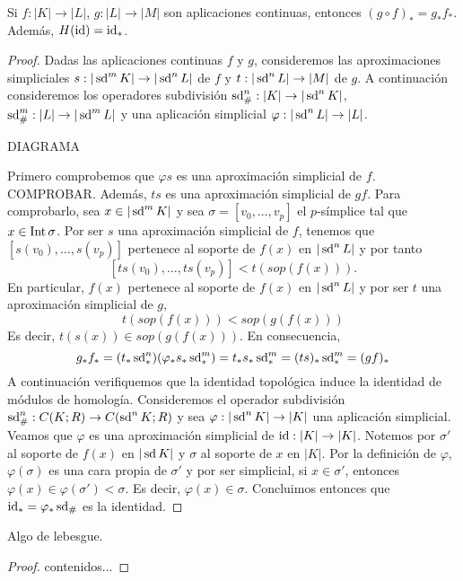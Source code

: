 \begin{teorema}
	Si $f: |K| \to |L|$, $g: |L| \to |M|$ son aplicaciones continuas, entonces $(g \circ f)_* = g_*f_*$. Además, $H(\operatorname{id}) = \operatorname{id}_*$.
\end{teorema}
\begin{proof}
	Dadas las aplicaciones continuas $f$ y $g$, consideremos las aproximaciones simpliciales $s : |\operatorname{sd}^m K| \to |\operatorname{sd}^n L|$ de $f$ y $t : |\operatorname{sd}^n L| \to |M|$ de $g$. A continuación consideremos los operadores subdivisión $\operatorname{sd}_\#^n : |K| \to |\operatorname{sd}^n K|$, $\operatorname{sd}_\#^m : |L| \to |\operatorname{sd}^m L|$ y una aplicación simplicial $\varphi : |\operatorname{sd}^n L| \to |L|$. 
	
	DIAGRAMA
	
	Primero comprobemos que $\varphi s$ es una aproximación simplicial de $f$. COMPROBAR. Además, $ts$ es una aproximación simplicial de $gf$. Para comprobarlo, sea $x \in |\operatorname{sd}^m K|$ y sea $\sigma = [v_0, \dots, v_p]$ el $p$-símplice tal que $x \in \operatorname{Int} \sigma$. Por ser $s$ una aproximación simplicial de $f$, tenemos que $[s(v_0), \dots, s(v_p)]$ pertenece al soporte de $f(x)$ en $|\operatorname{sd}^n L|$ y por tanto
	\[
		[ts(v_0), \dots, ts(v_p)] < t(sop(f(x))).
	\]
	En particular, $f(x)$ pertenece al soporte de $f(x)$ en $|\operatorname{sd}^n L|$ y por ser $t$ una aproximación simplicial de $g$,
	\[
		t(sop(f(x))) < sop(g(f(x)))
	\]
	Es decir, $t(s(x)) \in sop(g(f(x)))$.  En consecuencia,
	\[
		g_*f_* = (t_* \operatorname{sd}_*^n)(\varphi_* s_* \operatorname{sd}_*^m) = t_* s_* \operatorname{sd}_*^m = (ts)_* \operatorname{sd}_*^m = (gf)_*
	\]
	A continuación verifiquemos que la identidad topológica induce la identidad de módulos de homología. Consideremos el operador subdivisión $\operatorname{sd}_\#^n : C(K;R) \to C(\operatorname{sd}^n K;R)$ y sea $\varphi : |\operatorname{sd}^n K| \to |K|$ una aplicación simplicial. Veamos que $\varphi$ es una aproximación simplicial de $\operatorname{id} : |K| \to |K|$. Notemos por $\sigma'$ al soporte de $f(x)$ en $|\operatorname{sd} K|$ y $\sigma$ al soporte de $x$ en $|K|$. Por la definición de $\varphi$, $\varphi(\sigma)$ es una cara propia de $\sigma'$ y por ser simplicial, si $x \in \sigma'$, entonces $\varphi(x) \in \varphi(\sigma') < \sigma$. Es decir, $\varphi(x) \in \sigma$. Concluimos entonces que $\operatorname{id}_* = \varphi_* \operatorname{sd}_\#$ es la identidad.
\end{proof}

\begin{lema}
	Algo de lebesgue.
\end{lema}
\begin{proof}
	contenidos...
\end{proof}

